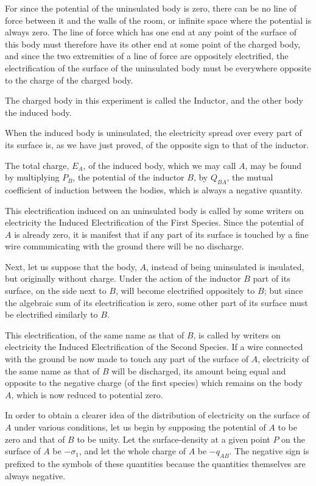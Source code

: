 \documentclass[12pt,oneside]{book}[2021/10/04]
\newcommand{\Runhead}[1]{\fancyhead[C]{\iffloatpage{}{\small#1}}}
\newcommand{\¬}{\hphantom{0}}
\begin{document}
For since the potential of the uninsulated body is zero, there
can be no line of force between it and the walls of the room, or
infinite space where the potential is always zero. The line of force
which has one end at any point of the surface of this body must
therefore have its other end at some point of the charged body,
and since the two extremities of a line of force are oppositely
electrified, the electrification of the surface of the uninsulated body
must be everywhere opposite to the charge of the charged body.
\Runhead{INDUCED ELECTRIFICATION.}

The charged body in this experiment is called the Inductor, and
the other body the induced body.

When the induced body is uninsulated, the electricity spread
over every part of its surface is, as we have just proved, of the
opposite sign to that of the inductor.

The total charge, \(E_A\), of the induced body, which we may call \(A\),
may be found by multiplying \(P_B\), the potential of the inductor \(B\),
by \(Q_{BA}\), the mutual coefficient of induction between the bodies,
which is always a negative quantity.

This electrification induced on an uninsulated body is called
by some writers on electricity the Induced Electrification of the
First Species. Since the potential of \(A\) is already zero, it is
manifest that if any part of its surface is touched by a fine wire
communicating with the ground there will be no discharge.

Next, let us suppose that the body, \(A\), instead of being uninsulated
is insulated, but originally without charge. Under the
action of the inductor \(B\) part of its surface, on the side next to \(B\),
will become electrified oppositely to \(B\); but since the algebraic
sum of its electrification is zero, some other part of its surface must
be electrified similarly to \(B\).

This electrification, of the same name as that of \(B\), is called by
writers on electricity the Induced Electrification of the Second
Species. If a wire connected with the ground be now made to
touch any part of the surface of \(A\), electricity of the same name
as that of \(B\) will be discharged, its amount being equal and opposite
to the negative charge (of the first species) which remains
on the body \(A\), which is now reduced to potential zero.

In order to obtain a clearer idea of the distribution of electricity
on the surface of \(A\) under various conditions, let us begin by
supposing the potential of \(A\) to be zero and that of \(B\) to be unity.
Let the surface-density at a given point \(P\) on the surface of \(A\)
be \(-\sigma_1\), and let the whole charge of \(A\) be \(-q_{AB}\). The negative
sign is prefixed to the symbols of these quantities because the
quantities themselves are always negative.
\Runhead{COEFFICIENTS OF CAPACITY.}
\end{document}
